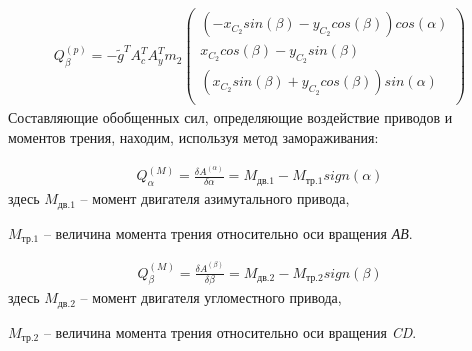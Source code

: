 \vspace{\baselineskip}

\begin{equation} %
\label{eq:p3:37}
\begin{multlined}
Q_{ \beta }^{ \left( p \right) }=-\tilde{g}^{T}A_{c}^{T}A_{y}^{T}m_{2} \left( \begin{matrix}
\left( -x_{C_{2}}sin \left(  \beta  \right) -y_{C_{2}}cos \left(  \beta  \right)  \right) cos \left(  \alpha  \right) \\
x_{C_{2}}cos \left(  \beta  \right) -y_{C_{2}}sin \left(  \beta  \right) \\
\left( x_{C_{2}}sin \left(  \beta  \right) +y_{C_{2}}cos \left(  \beta  \right)  \right) sin \left(  \alpha  \right) \\
\end{matrix}
\right) 
\end{multlined}
\end{equation}
Составляющие обобщенных сил, определяющие воздействие приводов и моментов трения, находим, используя метод замораживания:\par


\begin{equation} %
\label{eq:p3:38}
\begin{multlined}
Q_{ \alpha }^{ \left( M \right) }=\frac{ \delta A^{ \left(  \alpha  \right) }}{ \delta  \alpha }=M_{\textit{дв.1}}-M_{\textit{тр.1}}sign \left(  \alpha  \right) 
\end{multlined}
\end{equation}
здесь  \( M_{\textit{дв.1}} \) – момент двигателя азимутального привода,\par

\( M_{\textit{тр.1}} \) – величина момента трения относительно оси вращения \textit{АВ}.\par


\begin{equation} %
\label{eq:p3:39}
\begin{multlined}
Q_{ \beta }^{ \left( M \right) }=\frac{ \delta A^{ \left(  \beta  \right) }}{ \delta  \beta }=M_{\textit{дв.2}}-M_{\textit{тр.2}}sign \left(  \beta  \right) 
\end{multlined}
\end{equation}
здесь  \( M_{\textit{дв.2}} \) – момент двигателя угломестного привода,\par

\( M_{\textit{тр.2}} \) – величина момента трения относительно оси вращения \textit{CD}.\par

